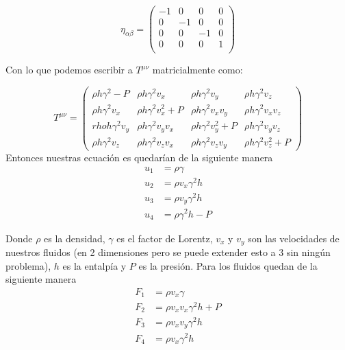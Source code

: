 \documentclass[12pt,a4paper]{book}
\begin{document}
\begin{equation}
\eta_{\alpha \beta}= 
\begin{pmatrix}
 -1 & 0 & 0 & 0 \\
 0 & -1 & 0 & 0 \\
 0 & 0 & -1 & 0 \\
 0 & 0 & 0 & 1 \\
\end{pmatrix}
\end{equation}

Con lo que podemos escribir a $T^{\mu \nu}$ matricialmente como:

\begin{equation}
T^{\mu \nu} =
\begin{pmatrix}
\rho h \gamma^2-P & \rho h \gamma^2 v_{x}  & \rho h \gamma^2 v_{y} & \rho h \gamma^2 v_{z} \\

\rho h \gamma^2 v_{x} & \rho h \gamma^2 v_{x}^{2}+P & \rho h \gamma^2 v_{x}v_{y} &  \rho h \gamma^2 v_{x}v_{z} \\

rho h \gamma^2 v_{y} & \rho h \gamma^2 v_{y}v_{x} & \rho h \gamma^2 v_{y}^{2}+P & \rho h \gamma^2 v_{y}v_{z}\\

\rho h \gamma^2 v_{z} & \rho h \gamma^2 v_{z}v_{x} & \rho h \gamma^2 v_{z}v_{y} & \rho h \gamma^2 v_{z}^2 + P

\end{pmatrix}
\end{equation}
Entonces nuestras ecuación  es quedarían de la siguiente manera
\begin{align}
u_{1}& = \rho \gamma \\ 
u_{2}& = \rho v_{x} \gamma^{2} h \\ 
u_{3}& = \rho v_{y} \gamma^{2} h \\ 
u_{4}& = \rho \gamma^{2} h - P 
\end{align}

Donde $\rho$ es la densidad, $\gamma$ es el factor de Lorentz, $v_{x}$ y $v_{y}$ son las velocidades de nuestros fluidos (en 2 dimensiones pero se puede extender esto a 3 sin ningún problema), $h$ es la entalpía  y $P$ es la presión. Para los fluidos quedan de la siguiente manera
\begin{align}
F_{1}& = \rho v_{x} \gamma \\ 
F_{2}& = \rho v_{x} v_{x} \gamma^{2} h + P\\ 
F_{3}& = \rho v_{x} v_{y} \gamma^{2} h \\ 
F_{4}& = \rho v_{x} \gamma^{2} h 
\end{align}
\end{document}

